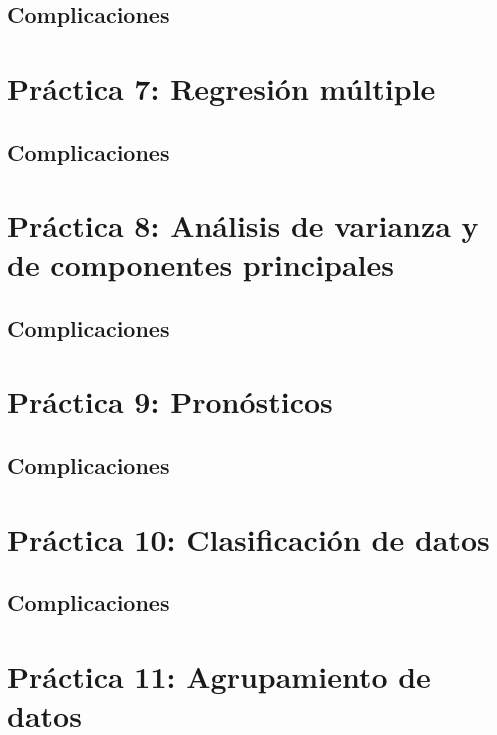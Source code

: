 \documentclass[12pt, letter]{report}
\begin{document}
\section*{Complicaciones}



\chapter*{Práctica 7: Regresión múltiple}
\section*{Complicaciones}



\chapter*{Práctica 8: Análisis de varianza y de componentes principales}
\section*{Complicaciones}



\chapter*{Práctica 9: Pronósticos}
\section*{Complicaciones}



\chapter*{Práctica 10: Clasificación de datos}
\section*{Complicaciones}



\chapter*{Práctica 11: Agrupamiento de datos}
\end{document}

